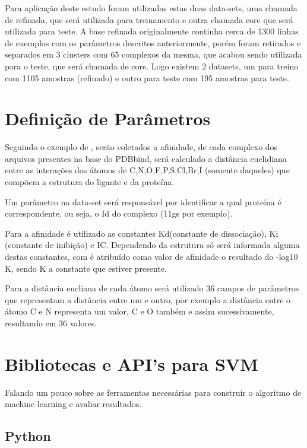 \documentclass[tcc, capa]{texucpel}
\begin{document}
Para aplicação deste estudo foram utilizadas estas duas data-sets, uma chamada de refinada, que será utilizada para treinamento e outra chamada core que será utilizada para teste. 
A base refinada originalmente continha cerca de 1300 linhas de exemplos com os parâmetros descritos anteriormente, porém foram retirados e separados em 3 clusters com 65 complexos da mesma, que acabou sendo utilizada para o teste, que será chamada de core. Logo existem  2 datasets, um para treino com 1105 amostras (refinado) e outro para teste com 195 amostras para teste.


\section{Definição de Parâmetros}

Seguindo o exemplo de \cite{ballester2010machine}, serão coletados a afinidade, de cada complexo dos arquivos presentes na base do PDBbind, será calculado a distância euclidiana entre as interações dos átomos de C,N,O,F,P,S,Cl,Br,I (somente daqueles) que compõem a estrutura do ligante e da proteína.

Um parâmetro na data-set será responsável por identificar a qual proteína é correspondente, ou seja, o Id do complexo (11gs por exemplo).

Para a afinidade é utilizado as constantes Kd(constante de dissociação), Ki (constante de inibição) e IC. Dependendo da estrutura só será informada alguma destas constantes, com é atribuído como valor de afinidade o resultado do -log10 K, sendo K a constante que estiver presente.

Para a distância eucliana de cada átomo será utilizado 36 campos de parâmetros que representam a distância entre um e outro, por exemplo a distância entre o átomo C e N representa um valor, C e O também e assim sucessivamente, resultando em 36 valores. 


\section{Bibliotecas e API's para SVM}

Falando um pouco sobre as ferramentas necessárias para construir o algoritmo de machine learning e avaliar resultados.

\subsection{Python}%
\end{document}
